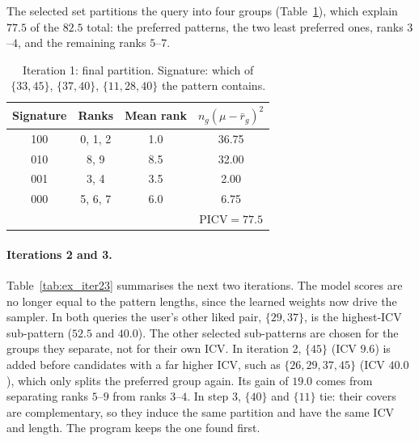 The selected set partitions the query into four groups (Table~\ref{tab:ex_partition1}), which explain
$77.5$ of the $82.5$ total: the preferred patterns, the two least preferred ones, ranks $3$--$4$, and the
remaining ranks $5$--$7$.

\begin{table}[t]
\centering
\caption{Iteration 1: final partition. Signature: which of $\{33,45\}$, $\{37,40\}$, $\{11,28,40\}$ the
pattern contains.}
\label{tab:ex_partition1}
\small
\begin{tabular}{cccc}
\toprule
Signature & Ranks & Mean rank & $n_g (\mu - \bar{r}_g)^2$ \\
\midrule
100 & 0, 1, 2 & 1.0 & 36.75 \\
010 & 8, 9    & 8.5 & 32.00 \\
001 & 3, 4    & 3.5 & 2.00 \\
000 & 5, 6, 7 & 6.0 & 6.75 \\
\midrule
    &         &     & $\mathrm{PICV} = 77.5$ \\
\bottomrule
\end{tabular}
\end{table}

\paragraph{Iterations 2 and 3.}
Table~\ref{tab:ex_iter23} summarises the next two iterations. The model scores are no longer equal to the
pattern lengths, since the learned weights now drive the sampler. In both queries the user's other liked pair,
$\{29, 37\}$, is the highest-ICV sub-pattern ($52.5$ and $40.0$). The other selected sub-patterns
are chosen for the groups they separate, not for their own ICV. In iteration 2, $\{45\}$ (ICV $9.6$) is added
before candidates with a far higher ICV, such as $\{26, 29, 37, 45\}$ (ICV $40.0$), which only splits the
preferred group again. Its gain of $19.0$ comes from separating ranks $5$--$9$ from ranks $3$--$4$. In step 3,
$\{40\}$ and $\{11\}$ tie: their covers are complementary, so they induce the same partition and have the same
ICV and length. The program keeps the one found first.

